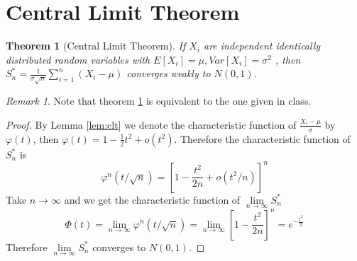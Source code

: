 \documentclass{article}
\theoremstyle{definition}
\theoremstyle{plain}
\newtheorem{theorem}{Theorem}[section]
\theoremstyle{remark}
\newtheorem*{remark}{Remark}
\begin{document}
\section{Central Limit Theorem}
\begin{theorem}[Central Limit Theorem\cite{waterloo}]
	If $X_i$ are independent identically distributed random variables with $E[X_i] = \mu, Var[X_i] = \sigma^2$ , then $S_n^* = \frac1{\sigma\sqrt n}\sum_{i=1}^n(X_i-\mu)$ converges weakly to $N(0, 1)$.
	\label{thm:clt}
\end{theorem}
\begin{remark}
	Note that theorem \ref{thm:clt} is equivalent to the one given in class.
\end{remark}
\begin{proof}
	By Lemma \ref{lem:clt} we denote the characteristic function of $\frac{X_i-\mu}{\sigma}$ by $\varphi(t)$, then  $\varphi(t)=1-\frac12t^2+o(t^2)$. Therefore the characteristic function of $S_n^*$ is 
	$$\varphi^n(t/\sqrt{n})=[1-\frac{t^2}{2n}+o(t^2/n)]^n$$
	Take $n\to\infty$ and we get the characteristic function of $\lim\limits_{n\to\infty}S^*_n$
	$$\varPhi(t)=\lim\limits_{n\to\infty}\varphi^n(t/\sqrt{n})
	=\lim\limits_{n\to\infty}[1-\frac{t^2}{2n}]^n=e^{-\frac{t^2}2}$$
	Therefore $\lim\limits_{n\to\infty}S_n^*$ converges to $N(0,1)$.
\end{proof}
\medskip



\end{document}
